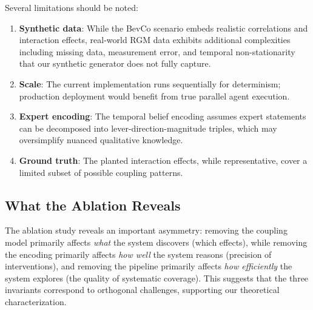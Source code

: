 Several limitations should be noted:
\begin{enumerate}
    \item \textbf{Synthetic data}: While the BevCo scenario embeds realistic correlations and interaction effects, real-world RGM data exhibits additional complexities including missing data, measurement error, and temporal non-stationarity that our synthetic generator does not fully capture.
    \item \textbf{Scale}: The current implementation runs sequentially for determinism; production deployment would benefit from true parallel agent execution.
    \item \textbf{Expert encoding}: The temporal belief encoding assumes expert statements can be decomposed into lever-direction-magnitude triples, which may oversimplify nuanced qualitative knowledge.
    \item \textbf{Ground truth}: The planted interaction effects, while representative, cover a limited subset of possible coupling patterns.
\end{enumerate}

\subsection{What the Ablation Reveals}

The ablation study reveals an important asymmetry: removing the coupling model primarily affects \emph{what} the system discovers (which effects), while removing the encoding primarily affects \emph{how well} the system reasons (precision of interventions), and removing the pipeline primarily affects \emph{how efficiently} the system explores (the quality of systematic coverage).
This suggests that the three invariants correspond to orthogonal challenges, supporting our theoretical characterization.
